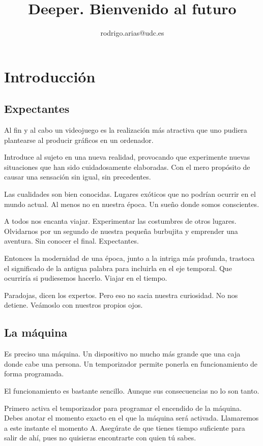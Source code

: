 \documentclass[11pt,a4paper]{article}
\title{\textbf{Deeper. Bienvenido al futuro}}
\author{rodrigo.arias@udc.es}
\date{}
\begin{document}
\maketitle

\section{Introducción}
\subsection{Expectantes}

Al fin y al cabo un videojuego es la realización más atractiva que uno pudiera 
plantearse al producir gráficos en un ordenador.

Introduce al sujeto en una nueva realidad, provocando que experimente nuevas 
situaciones que han sido cuidadosamente elaboradas. Con el mero propósito de 
causar una sensación sin igual, sin precedentes.

Las cualidades son bien conocidas. Lugares exóticos que no podrían ocurrir en el 
mundo actual. Al menos no en nuestra época. Un sueño donde somos conscientes.  

A todos nos encanta viajar. Experimentar las costumbres de otros lugares.  
Olvidarnos por un segundo de nuestra pequeña burbujita y emprender una aventura.  
Sin conocer el final. Expectantes.

Entonces la modernidad de una época, junto a la intriga más profunda, trastoca 
el significado de la antigua palabra para incluirla en el eje temporal. Que 
ocurriría si pudiesemos hacerlo. Viajar en el tiempo.

Paradojas, dicen los expertos. Pero eso no sacia nuestra curiosidad. No nos 
detiene. Veámoslo con nuestros propios ojos.

\subsection{La máquina}

Es preciso una máquina. Un dispositivo no mucho más grande que una caja donde 
cabe una persona. Un temporizador permite ponerla en funcionamiento de forma programada.

El funcionamiento es bastante sencillo. Aunque sus consecuencias no lo son 
tanto.

Primero activa el temporizador para programar el encendido de la máquina.  
Debes anotar el momento exacto en el que la máquina será activada. Llamaremos a 
este instante el momento A. Asegúrate de que tienes tiempo suficiente para salir 
de ahí, pues no quisieras encontrarte con quien tú sabes.
\end{document}
